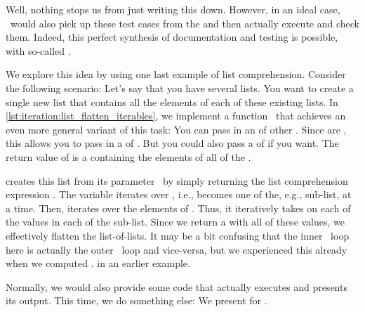 Well, nothing stops us from just writing this down.
However, in an ideal case, \pytest\ would also pick up these test cases from the  and then actually execute and check them.
Indeed, this perfect synthesis of documentation and testing is possible, with so-called .

We explore this idea by using one last example of list comprehension.
Consider the following scenario:
Let's say that you have several lists.
You want to create a single new list that contains all the elements of each of these existing lists.
In \cref{lst:iteration:list_flatten_iterables}, we implement a function~ that achieves an even more general variant of this task:
You can pass in an  of other .
Since  are , this allows you to pass in a  of .
But you could also pass a  of  if you want.
The return value of  is a  containing the elements of all of the  .%
%
\begin{sloppypar}%
 creates this list from its parameter~ by simply returning the list comprehension expression .
The variable  iterates over , i.e., becomes one of the, e.g., sub-list, at a time.
Then,  iterates over the elements of .
Thus, it iteratively takes on each of the values in each of the sub-list.
Since we return a  with all of these values, we effectively flatten the list-of-lists.
It may be a bit confusing that the inner ~loop here is actually the outer ~loop and vice-versa, but we experienced this already when we computed . in an earlier example.%
\end{sloppypar}%
%
Normally, we would also provide some code that actually executes  and presents its output.
This time, we do something else:
We present  for .

